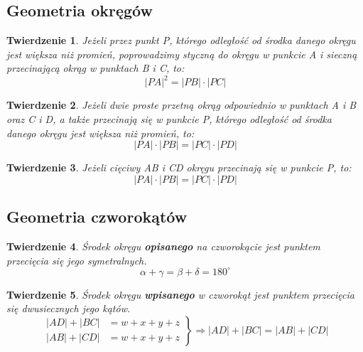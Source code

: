 \documentclass{article}
\numberwithin{equation}{section}
\newtheorem{theorem}{Twierdzenie}[section]
\begin{document}
    \subsection{Geometria okręgów}
      \begin{theorem}
        Jeżeli przez punkt P, którego odległość od środka danego okręgu jest większa niż promień, poprowadzimy styczną do okręgu w punkcie A i sieczną przecinającą okrąg w punktach B i C, to:
        \begin{equation}
          |PA|^2 = |PB| \cdot |PC|
        \end{equation}
      \end{theorem}
      \begin{theorem}
        Jeżeli dwie proste przetną okrąg odpowiednio w punktach A i B oraz C i D, a także przecinają się w punkcie P, którego odległość od środka danego okręgu jest większa niż promień, to:
        \begin{equation}
          |PA| \cdot |PB| = |PC| \cdot |PD|
        \end{equation}
      \end{theorem}
      \begin{theorem}
        Jeżeli cięciwy AB i CD okręgu przecinają się w punkcie P, to:
        \begin{equation}
          |PA| \cdot |PB| = |PC| \cdot |PD|
        \end{equation}
      \end{theorem}

    \subsection{Geometria czworokątów}
      \begin{theorem}
        Środek okręgu \textbf{opisanego} na czworokącie jest punktem przecięcia się jego symetralnych.
        \begin{equation}
          \alpha + \gamma = \beta + \delta = 180^\circ
        \end{equation}
      \end{theorem}
      \begin{theorem}
        Środek okręgu \textbf{wpisanego} w czworokąt jest punktem przecięcia się dwusiecznych jego kątów.
        \begin{equation}
          \left.
            \begin{aligned}
              |AD| + |BC| &= w+x+y+z\\
              |AB| + |CD| &= w+x+y+z
            \end{aligned}
          \right\}
          \Rightarrow |AD| + |BC| = |AB| + |CD|
        \end{equation}
      \end{theorem}
\end{document}
